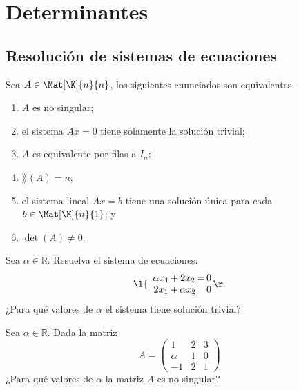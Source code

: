 \documentclass[compacto,10pt]{pubciencias-notas}
\begin{document}
\encabezado

\vspace*{-8mm}

\setcounter{section}{2}
\section{Determinantes}
\setcounter{subsection}{1}
\subsection{Resolución de sistemas de ecuaciones}

\begin{teo}
Sea $A\in\Mat[\K]{n}{n}$, los siguientes enunciados son equivalentes.
\begin{enumerate}
\item $A$ es no singular;
\item el sistema $Ax=0$ tiene solamente la solución trivial;
\item $A$ es equivalente por filas a $I_{n}$;
\item $\rang(A)=n$;
\item el sistema lineal $Ax=b$ tiene una solución única para cada $b\in\Mat[\K]{n}{1}$; y
\item $\det(A)\neq0$.
\end{enumerate}
\end{teo}
\begin{ejer}
    Sea $\alpha\in\mathbb{R}$. Resuelva el sistema de ecuaciones:
     \[
        \l\{
        \begin{array}{c@{\,}c@{\,}c@{\,}c@{\,}c@{\,}c@{\,}c}
        \alpha x_1  & + & 2x_2 &= & 0 \\
        2x_1  & + & \alpha x_2 &= & 0
        \end{array}
        \r.
    \]
    ¿Para qué valores de $\alpha$ el sistema tiene solución trivial?
\end{ejer}
\begin{ejer}
    Sea $\alpha\in\mathbb{R}$. Dada la matriz
     \[
        A=\begin{pmatrix}
            1&2&3\\
            \alpha&1&0\\
            -1&2&1
        \end{pmatrix}
    \]
    ¿Para qué valores de $\alpha$ la matriz $A$ es no singular?
\end{ejer}
\end{document}

